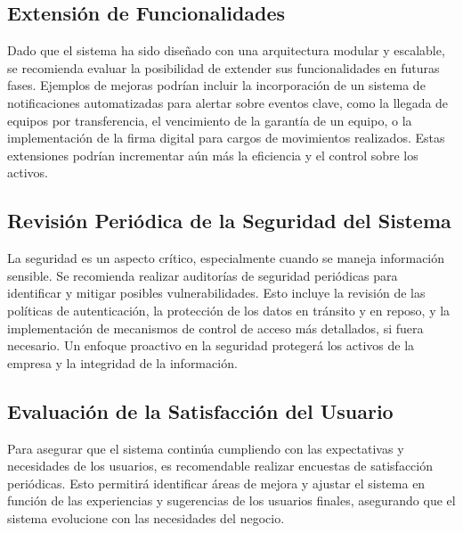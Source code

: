 \documentclass[stu, 12pt, letterpaper, donotrepeattitle, floatsintext, natbib]{apa7}
\begin{document}
\subsection{Extensión de Funcionalidades}
Dado que el sistema ha sido diseñado con una arquitectura modular y escalable, se recomienda evaluar la posibilidad de extender sus
funcionalidades en futuras fases. Ejemplos de mejoras podrían incluir la incorporación de un sistema de notificaciones automatizadas para
alertar sobre eventos clave, como la llegada de equipos por transferencia, el vencimiento de la garantía de un equipo, o la implementación de
la firma digital para cargos de movimientos realizados. Estas extensiones podrían incrementar aún más la eficiencia y el control sobre los
activos.
\subsection{Revisión Periódica de la Seguridad del Sistema}
La seguridad es un aspecto crítico, especialmente cuando se maneja información sensible. Se recomienda realizar auditorías de seguridad
periódicas para identificar y mitigar posibles vulnerabilidades. Esto incluye la revisión de las políticas de autenticación, la protección de
los datos en tránsito y en reposo, y la implementación de mecanismos de control de acceso más detallados, si fuera necesario. Un enfoque
proactivo en la seguridad protegerá los activos de la empresa y la integridad de la información.
\subsection{Evaluación de la Satisfacción del Usuario}
Para asegurar que el sistema continúa cumpliendo con las expectativas y necesidades de los usuarios, es recomendable realizar encuestas de
satisfacción periódicas. Esto permitirá identificar áreas de mejora y ajustar el sistema en función de las experiencias y sugerencias de los
usuarios finales, asegurando que el sistema evolucione con las necesidades del negocio.
\end{document}
